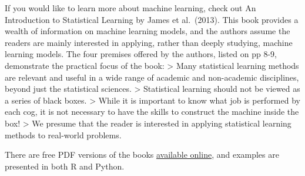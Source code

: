 \documentclass[
]{book}
\begin{document}
If you would like to learn more about machine learning, check out An Introduction to Statistical Learning by James et al.~(2013). This book provides a wealth of information on machine learning models, and the authors assume the readers are mainly interested in applying, rather than deeply studying, machine learning models. The four premises offered by the authors, listed on pp 8-9, demonstrate the practical focus of the book:
\textgreater{} Many statistical learning methods are relevant and useful in a wide range of academic and non-academic disciplines, beyond just the statistical sciences.
\textgreater{} Statistical learning should not be viewed as a series of black boxes.
\textgreater{} While it is important to know what job is performed by each cog, it is not necessary to have the skills to construct the machine inside the box!
\textgreater{} We presume that the reader is interested in applying statistical learning methods to real-world problems.

There are free PDF versions of the books \href{https://www.statlearning.com/}{available online}, and examples are presented in both R and Python.

  
\end{document}
